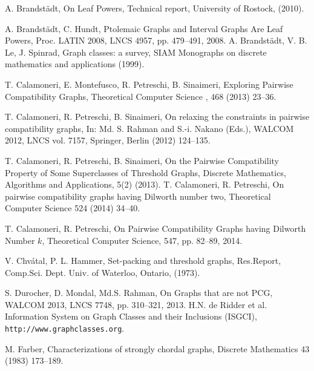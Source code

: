 \documentclass{elsarticle}
\begin{document}
\begin{thebibliography}{00}

\begin{small}


A. Brandst\"adt, On Leaf Powers, Technical report, University of Rostock, (2010).



A. Brandst\"adt, C. Hundt,
Ptolemaic Graphs and Interval Graphs Are Leaf Powers, Proc. LATIN 2008, LNCS 4957, pp. 479--491, 2008.
A. Brandst\"adt, V. B. Le,  J. Spinrad,  Graph classes: a survey,  SIAM Monographs 
on discrete mathematics and applications (1999).









 T. Calamoneri, E. Montefusco, R. Petreschi, B. Sinaimeri, Exploring Pairwise Compatibility Graphs, Theoretical Computer Science , 468 (2013) 23--36. 



T. Calamoneri, R. Petreschi,  B. Sinaimeri,  On relaxing the constraints in 
pairwise compatibility graphs, In: Md. S. Rahman and S.-i. Nakano (Eds.), WALCOM 2012, LNCS vol. 7157, Springer, Berlin (2012) 124--135.

T. Calamoneri, R. Petreschi,  B. Sinaimeri, On the Pairwise Compatibility Property of Some Superclasses of Threshold Graphs, Discrete Mathematics, Algorithms and Applications, 5(2) (2013).
T. Calamoneri, R. Petreschi, On pairwise compatibility graphs having Dilworth number two, Theoretical Computer Science 524 (2014) 34--40.

T. Calamoneri, R. Petreschi, On Pairwise Compatibility Graphs having Dilworth Number $k$, Theoretical Computer Science, 547, pp. 82--89, 2014.


V. Chv\'atal, P. L. Hammer, Set-packing and threshold graphs, Res.Report,
Comp.Sci. Dept. Univ. of Waterloo, Ontario, (1973).

S. Durocher, D. Mondal, Md.S. Rahman, On Graphs that are not PCG, WALCOM 2013, LNCS 7748, pp. 310--321, 2013. 
H.N. de Ridder et al. Information System on Graph Classes and their Inclusions (ISGCI), {\tt http://www.graphclasses.org}.

M. Farber, Characterizations of strongly chordal graphs, Discrete Mathematics 43  (1983) 173--189.







\end{small}
\end{thebibliography}
\end{document}
